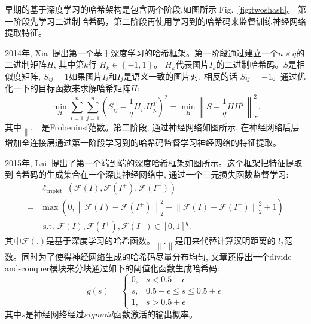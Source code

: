 早期的基于深度学习的哈希架构是包含两个阶段,如图所示 Fig.~\ref{fig:twoshash}。 第一阶段先学习二进制哈希码，第二阶段再使用学习到的哈希码来监督训练神经网络提取特征。\par
2014年, Xia~\cite{xia2014supervised}提出第一个基于深度学习的哈希框架。第一阶段通过建立一个$n \times q$的二进制矩阵$H$, 其中第$k$行 $H_k \in \left \{ -1, 1 \right \}$。 $H_k$代表图片$I_k$的二进制哈希码。$S$是相似度矩阵, $S_{ij} = 1$如果图片$I_i$和$I_j$是语义一致的图片对, 相反的话 $S_{ij} = -1$。通过优化一下的目标函数来求解哈希矩阵$H$:
\begin{equation}
    \min _H \sum_{i=1}^n \sum_{j=1}^n\left(S_{i j}-\frac{1}{q} H_i . H_{j .}^T\right)^2=\min _H\left\|S-\frac{1}{q} H H^T\right\|_F^2.
\end{equation}
其中$\left\| . \right\|$是Frobeniusf范数。第二阶段, 通过神经网络如图所示, 在神经网络后层增加全连接层通过第一阶段学习到的哈希码监督学习神经网络的特征提取。 \par


2015年, Lai~\cite{lai2015simultaneous}提出了第一个端到端的深度哈希框架如图所示。这个框架把特征提取到哈希码的生成集合在一个深度神经网络中, 通过一个三元损失函数监督学习:
\begin{equation}
    \begin{aligned}
        & \ell_{\text {triplet }}\left(\mathcal{F}(I), \mathcal{F}\left(I^{+}\right), \mathcal{F}\left(I^{-}\right)\right) \\
        = & \max \left(0,\left\|\mathcal{F}(I)-\mathcal{F}\left(I^{+}\right)\right\|_2^2-\left\|\mathcal{F}(I)-\mathcal{F}\left(I^{-}\right)\right\|_2^2+1\right) \\
        & \text { s.t. } \mathcal{F}(I), \mathcal{F}\left(I^{+}\right), \mathcal{F}\left(I^{-}\right) \in[0,1]^q.
        \end{aligned}
\end{equation}
其中$\mathcal{F}(.)$是基于深度学习的哈希函数。$\left \| . \right \|$是用来代替计算汉明距离的 $l_2$范数。同时为了使得神经网络生成的哈希码尽量分布均匀, 文章还提出一个divide-and-conquer模块来分块通过如下的阈值化函数生成哈希码:
\begin{equation}
    g(s)=\left\{\begin{array}{rr}
        0, & s<0.5-\epsilon \\
        s, & 0.5-\epsilon \leq s \leq 0.5+\epsilon \\
        1, & s>0.5+\epsilon
        \end{array}\right.
\end{equation} 
其中$s$是神经网络经过$sigmoid$函数激活的输出概率。




